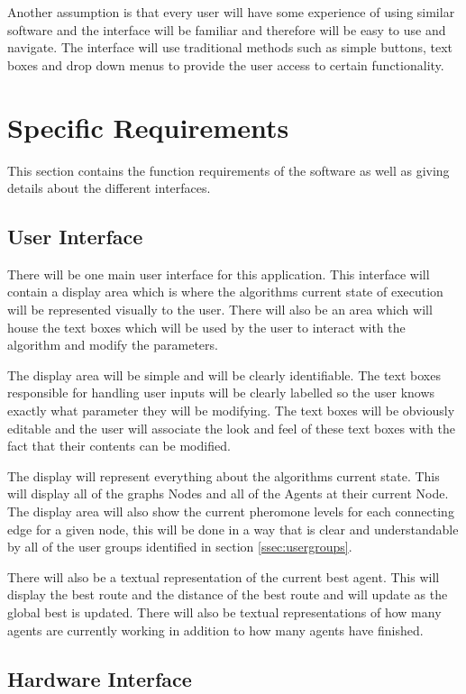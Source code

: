 Another assumption is that every user will have some experience of using similar software and the interface will be familiar and therefore will be easy to use and navigate. The interface will use traditional methods such as simple buttons, text boxes and drop down menus to provide the user access to certain functionality.

\section{Specific Requirements}

This section contains the function requirements of the software as well as giving details about the different interfaces.

\subsection{User Interface}

There will be one main user interface for this application. This interface will contain a display area which is where the algorithms current state of execution will be represented visually to the user. There will also be an area which will house the text boxes which will be used by the user to interact with the algorithm and modify the parameters.

The display area will be simple and will be clearly identifiable. The text boxes responsible for handling user inputs will be clearly labelled so the user knows exactly what parameter they will be modifying. The text boxes will be obviously editable and the user will associate the look and feel of these text boxes with the fact that their contents can be modified.

The display will represent everything about the algorithms current state. This will display all of the graphs Nodes and all of the Agents at their current Node. The display area will also show the current pheromone levels for each connecting edge for a given node, this will be done in a way that is clear and understandable by all of the user groups identified in section \ref{ssec:usergroups}.

There will also be a textual representation of the current best agent. This will display the best route and the distance of the best route and will update as the global best is updated. There will also be textual representations of how many agents are currently working in addition to how many agents have finished.

\subsection{Hardware Interface}

